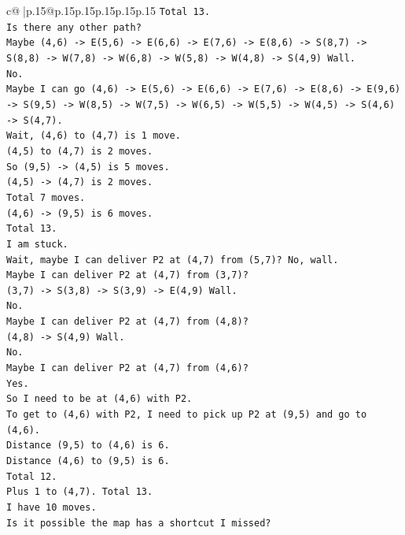 \documentclass{article}
\begin{document}
{\begin{supertabular}{c@{$\;$}|p{.15\linewidth}@{}p{.15\linewidth}p{.15\linewidth}p{.15\linewidth}p{.15\linewidth}p{.15\linewidth}}
{{{\texttt{Total 13.} \\
\texttt{Is there any other path?} \\
\texttt{Maybe (4,6) {-}> E(5,6) {-}> E(6,6) {-}> E(7,6) {-}> E(8,6) {-}> S(8,7) {-}> S(8,8) {-}> W(7,8) {-}> W(6,8) {-}> W(5,8) {-}> W(4,8) {-}> S(4,9) Wall.} \\
\texttt{No.} \\
\texttt{Maybe I can go (4,6) {-}> E(5,6) {-}> E(6,6) {-}> E(7,6) {-}> E(8,6) {-}> E(9,6) {-}> S(9,5) {-}> W(8,5) {-}> W(7,5) {-}> W(6,5) {-}> W(5,5) {-}> W(4,5) {-}> S(4,6) {-}> S(4,7).} \\
\texttt{Wait, (4,6) to (4,7) is 1 move.} \\
\texttt{(4,5) to (4,7) is 2 moves.} \\
\texttt{So (9,5) {-}> (4,5) is 5 moves.} \\
\texttt{(4,5) {-}> (4,7) is 2 moves.} \\
\texttt{Total 7 moves.} \\
\texttt{(4,6) {-}> (9,5) is 6 moves.} \\
\texttt{Total 13.} \\
\texttt{I am stuck.} \\
\texttt{Wait, maybe I can deliver P2 at (4,7) from (5,7)? No, wall.} \\
\texttt{Maybe I can deliver P2 at (4,7) from (3,7)?} \\
\texttt{(3,7) {-}> S(3,8) {-}> S(3,9) {-}> E(4,9) Wall.} \\
\texttt{No.} \\
\texttt{Maybe I can deliver P2 at (4,7) from (4,8)?} \\
\texttt{(4,8) {-}> S(4,9) Wall.} \\
\texttt{No.} \\
\texttt{Maybe I can deliver P2 at (4,7) from (4,6)?} \\
\texttt{Yes.} \\
\texttt{So I need to be at (4,6) with P2.} \\
\texttt{To get to (4,6) with P2, I need to pick up P2 at (9,5) and go to (4,6).} \\
\texttt{Distance (9,5) to (4,6) is 6.} \\
\texttt{Distance (4,6) to (9,5) is 6.} \\
\texttt{Total 12.} \\
\texttt{Plus 1 to (4,7). Total 13.} \\
\texttt{I have 10 moves.} \\
\texttt{Is it possible the map has a shortcut I missed?} \\
}}}
\end{supertabular}}
\end{document}
